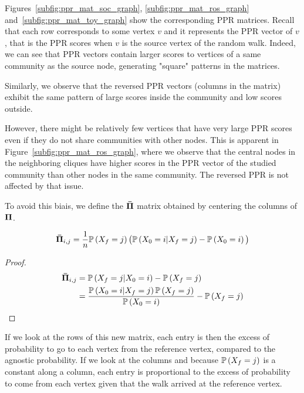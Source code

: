 Figures~\ref{subfig:ppr_mat_soc_graph}, \ref{subfig:ppr_mat_ros_graph} and~\ref{subfig:ppr_mat_toy_graph} show the corresponding PPR matrices. Recall that each row corresponds to some vertex $v$ and it represents the PPR vector of $v$, that is the PPR scores when $v$ is the source vertex of the random walk. Indeed, we can see that PPR vectors contain larger scores to vertices of a same community as the source node, generating "square" patterns in the matrices.

Similarly, we observe that the reversed PPR vectors (columns in the matrix) exhibit the same pattern of large scores inside the community and low scores outside.

However, there might be relatively few vertices that have very large PPR scores even if they do not share communities with other nodes. This is apparent in Figure~\ref{subfig:ppr_mat_ros_graph}, where we observe that the central nodes in the neighboring cliques have higher scores in the PPR vector of the studied community than other nodes in the same community. The reversed PPR is not affected by that issue.

To avoid this biais, we define the $\boldsymbol{\Bar{\Pi}}$ matrix obtained by centering the columns of $\boldsymbol{\Pi}$.

\begin{property}
    \begin{equation*}
        \boldsymbol{\Bar{\Pi}}_{i, j} = \frac{1}{n}\mathbb{P}\left(X_f = j\right)\big(\mathbb{P}\left(X_0=i|X_f=j\right)-\mathbb{P}\left(X_0 = i\right)\big)
    \end{equation*}
\end{property}

\begin{proof}
\begin{align*}
        \boldsymbol{\Bar{\Pi}}_{i, j} & =  \mathbb{P}\left(X_f = j | X_0 = i\right) - \mathbb{P}\left(X_f = j\right) \\
         & =  \frac{\mathbb{P}\left(X_0 = i | X_f = j\right)\mathbb{P}\left(X_f = j\right)}{
            \mathbb{P}\left(X_0=i\right)
        }
         - \mathbb{P}\left(X_f = j\right)
\end{align*}
\end{proof}

If we look at the rows of this new matrix, each entry is then the excess of probability to go to each vertex from the reference vertex, compared to the agnostic probability. If we look at the columns and because $\mathbb{P}\left(X_f =j\right)$ is a constant along a column, each entry is proportional to the excess of probability to come from each vertex given that the walk arrived at the reference vertex.

